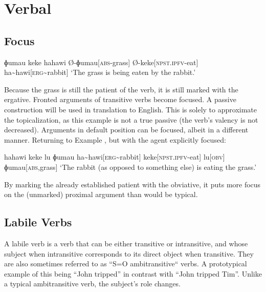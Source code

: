 \chapter{Verbal}

\section{Focus}

\ex
\begingl
\glpreamble ɸumau keke hahawi
\endpreamble
Ø-ɸumau[\textsc{abs-}grass]
Ø-keke[\textsc{npst.ipfv-}eat]
ha\textasciitilde hawi[\textsc{erg\textasciitilde}rabbit]
\glft `The grass is being eaten by the rabbit.'
\endgl
\xe

Because the grass is still the patient of the verb, it is still marked with the ergative. Fronted arguments of transitive verbs become focused. A passive construction will be used in translation to English. This is solely to approximate the topicalization, as this example is not a true passive (the verb's valency is not decreased). Arguments in default position can be focused, albeit in a different manner. Returning to Example , but with the agent explicitly focused:

\ex
\begingl
\glpreamble hahawi keke lu ɸumau
\endpreamble
ha\textasciitilde hawi[\textsc{erg\textasciitilde}rabbit]
keke[\textsc{npst.ipfv-}eat]
lu[\textsc{obv}]
ɸumau[\textsc{abs,}grass]
\glft `The rabbit (as opposed to something else) is eating the grass.'
\endgl
\xe

By marking the already established patient with the obviative\footnotemark, it puts more focus on the (unmarked) proximal argument than would be typical.


\section{Labile Verbs}\label{sec:labile_verbs}

A labile verb is a verb that can be either transitive or intransitive, and whose subject when intransitive corresponds to its direct object when transitive. They are also sometimes referred to as ``S=O ambitransitive`` verbs. A prototypical example of this being ``John tripped'' in contrast with ``John tripped Tim''. Unlike a typical ambitransitive verb, the subject's role changes.

